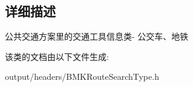 \subsection{详细描述}
公共交通方案里的交通工具信息类-\/ 公交车、地铁 

该类的文档由以下文件生成\+:\begin{DoxyCompactItemize}
\item 
output/headers/B\+M\+K\+Route\+Search\+Type.\+h\end{DoxyCompactItemize}
